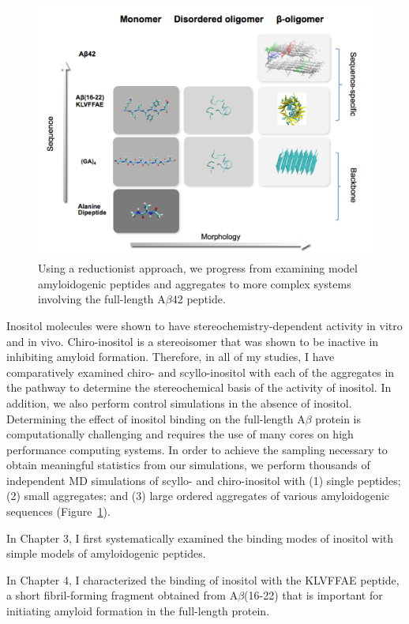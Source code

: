 \begin{figure}
\centering
\includegraphics[width=6in]{figures/introduction/matrix.pdf}
\caption[Thesis Rationale]{Using a reductionist approach, we progress from examining model amyloidogenic peptides and aggregates to more complex systems involving the full-length A$\beta$42 peptide.}
\label{fig:rationale}
\end{figure}

Inositol molecules were shown to have stereochemistry-dependent activity in vitro and in vivo. Chiro-inositol is a stereoisomer that was shown to be inactive in inhibiting amyloid formation. Therefore, in all of my studies, I have comparatively examined chiro- and scyllo-inositol with each of the aggregates in the pathway to determine the stereochemical basis of the activity of inositol. In addition, we also perform control simulations in the absence of inositol.   Determining the effect of inositol binding on the full-length A$\beta$ protein is computationally challenging and requires the use of many cores on high performance computing systems.  In order to achieve the sampling necessary to obtain meaningful statistics from our simulations, we perform thousands of independent MD simulations of  scyllo- and chiro-inositol with (1) single peptides; (2) small aggregates; and (3) large ordered aggregates of various amyloidogenic sequences (Figure~\ref{fig:rationale}).

In Chapter 3, I first systematically examined the binding modes of inositol with simple models of amyloidogenic peptides.

In Chapter 4, I characterized the binding of inositol with the KLVFFAE peptide, a short fibril-forming fragment obtained from A$\beta$(16-22) that is important for initiating amyloid formation in the full-length protein.


